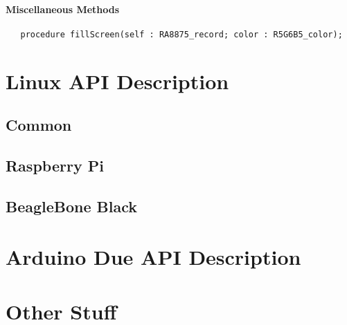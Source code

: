 \documentclass[10pt, openany]{book}
\newcommand{\comment}[1]{{\color{red}{#1}}}
\begin{document}
\subsubsection{Miscellaneous Methods}
\begin{lstlisting}
   procedure fillScreen(self : RA8875_record; color : R5G6B5_color);
\end{lstlisting}

\chapter{Linux API Description}

\section{Common}

\section{Raspberry Pi}

\section{BeagleBone Black}

\chapter{Arduino Due API Description}

\chapter{Other Stuff}
\comment{If there is anything else that should be added, additional chapters may be added as needed.}

\clearpage
{}


\end{document}
